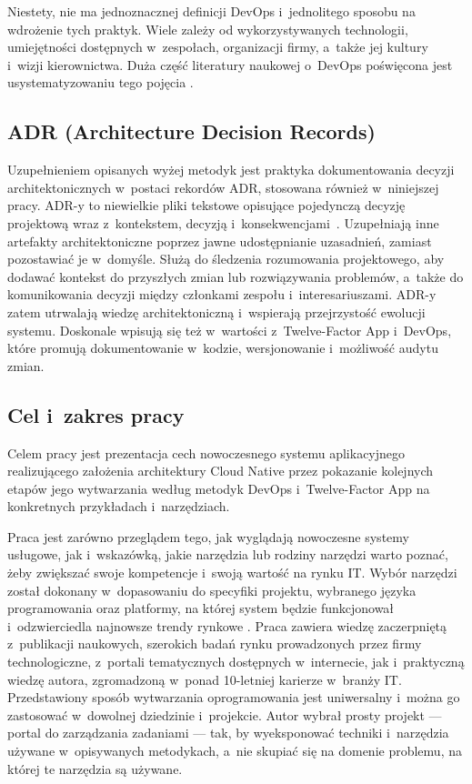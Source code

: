 Niestety, nie ma jednoznacznej definicji DevOps i~jednolitego sposobu na wdrożenie tych praktyk. Wiele zależy od wykorzystywanych technologii, umiejętności dostępnych w~zespołach, organizacji firmy, a~także jej kultury i~wizji kierownictwa. Duża część literatury naukowej o~DevOps poświęcona jest usystematyzowaniu tego pojęcia \cite{Erich2017DevOpsQualitative,Azad2022DevOpsFactors,Dyck2015DevOpsDefinitions}.

\subsection{ADR (Architecture Decision Records)}
Uzupełnieniem opisanych wyżej metodyk jest praktyka dokumentowania decyzji architektonicznych w~postaci rekordów ADR, stosowana również w~niniejszej pracy.
ADR-y to niewielkie pliki tekstowe opisujące pojedynczą decyzję projektową wraz z~kontekstem, decyzją i~konsekwencjami~\cite{Nygard2011ADR}.
Uzupełniają inne artefakty architektoniczne poprzez jawne udostępnianie uzasadnień, zamiast pozostawiać je w~domyśle.
Służą do śledzenia rozumowania projektowego, aby dodawać kontekst do przyszłych zmian lub rozwiązywania problemów, a~także do komunikowania decyzji między członkami zespołu i~interesariuszami.
ADR-y zatem utrwalają wiedzę architektoniczną i~wspierają przejrzystość ewolucji systemu.
Doskonale wpisują się też w~wartości z~Twelve-Factor App i~DevOps, które promują dokumentowanie w~kodzie, wersjonowanie i~możliwość audytu zmian.

\subsection{Cel i~zakres pracy}
Celem pracy jest prezentacja cech nowoczesnego systemu aplikacyjnego realizującego założenia architektury Cloud Native przez pokazanie kolejnych etapów jego wytwarzania według metodyk DevOps i~Twelve-Factor App na konkretnych przykładach i~narzędziach.

Praca jest zarówno przeglądem tego, jak wyglądają nowoczesne systemy usługowe, jak i~wskazówką, jakie narzędzia lub rodziny narzędzi warto poznać, żeby zwiększać swoje kompetencje i~swoją wartość na rynku IT.
Wybór narzędzi został dokonany w~dopasowaniu do specyfiki projektu, wybranego języka programowania oraz platformy, na której system będzie funkcjonował i~odzwierciedla najnowsze trendy rynkowe \cite{Jetbrains2022DevEcosystem,Tiobe2023Index}.
Praca zawiera wiedzę zaczerpniętą z~publikacji naukowych, szerokich badań rynku prowadzonych przez firmy technologiczne, z~portali tematycznych dostępnych w~internecie, jak i~praktyczną wiedzę autora, zgromadzoną w~ponad 10-letniej karierze w~branży IT.
Przedstawiony sposób wytwarzania oprogramowania jest uniwersalny i~można go zastosować w~dowolnej dziedzinie i~projekcie. Autor wybrał prosty projekt --- portal do zarządzania zadaniami --- tak, by wyeksponować techniki i~narzędzia używane w~opisywanych metodykach, a~nie skupiać się na domenie problemu, na której te narzędzia są używane.
